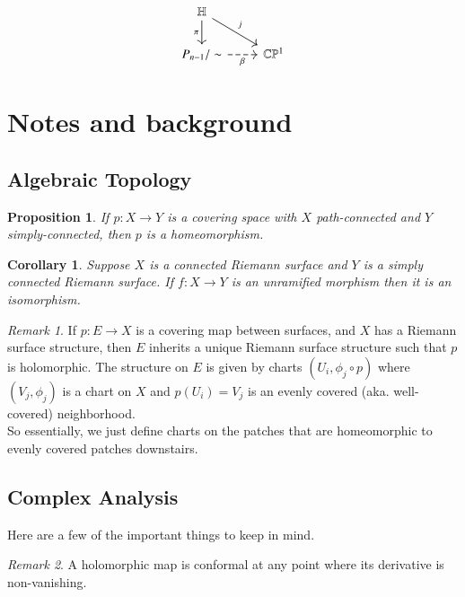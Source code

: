 \documentclass[reqno]{amsart}
\newtheorem{proposition}[theorem]{Proposition}
\newtheorem{corollary}[theorem]{Corollary}
\theoremstyle{definition}
\theoremstyle{remark}
\newtheorem*{remark}{Remark}
\begin{document}
    \[
    \begin{tikzcd}
        \mathbb{H} \ar[d, "\pi"']
        \ar[dr, "j"] & \\
        P_{n-1}/\sim \ar[r, dashed, "\beta"'] & \mathbb{C}\mathbb{P}^1
    \end{tikzcd}
    \]

\section{Notes and background}

\subsection{Algebraic Topology}



\begin{proposition}
    If $p \colon X \to Y$ is a covering space with $X$ path-connected and
    $Y$ simply-connected, then $p$ is a homeomorphism.
\end{proposition} 

\begin{corollary}
    Suppose $X$ is a connected Riemann surface and $Y$ is a simply connected
    Riemann surface. If $f \colon 
    X \to Y$ is an unramified morphism then it is an isomorphism.
\end{corollary}


\begin{remark}\label{sec:algtop}
    If $p \colon E \to X$ is a covering map between
    surfaces, and $X$ has a Riemann surface structure, then
    $E$ inherits a unique Riemann surface structure such that
    $p$ is holomorphic. The structure on $E$ is given by
    charts $(U_i, \phi_j \circ p)$ where
    $(V_j, \phi_j)$ is a chart on $X$ and
    $p (U_i)= V_j$ is an evenly covered (aka. well-covered) neighborhood.\\
    So essentially, we just define charts on the patches that
    are homeomorphic to evenly covered patches downstairs.
\end{remark}


\subsection{Complex Analysis}
Here are a few of the important things to keep in mind.

\begin{remark}
    A holomorphic map is conformal at any point where its derivative is non-vanishing. 
\end{remark}
\end{document}

